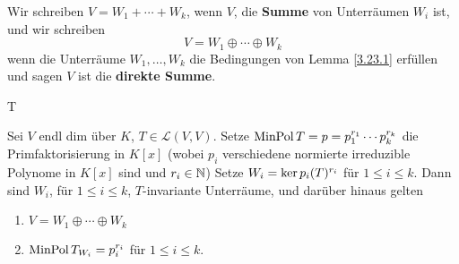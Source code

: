 \begin{subdefinition*}
	Wir schreiben $ V = W_1 + \dotsb + W_k $, wenn $ V $, die \textbf{Summe} von Unterräumen $ W_i $ ist, und wir schreiben
	\[
		V = W_1 \oplus \dotsb \oplus W_k
	\]
	wenn die Unterräume $ W_1, \dotsc, W_k $ die Bedingungen von Lemma \ref{3.23.1} erfüllen und sagen $ V $ ist die \textbf{direkte Summe}.
\end{subdefinition*}
T
\begin{subtheorem}
	Sei $ V $ endl dim über $ K $, $ T \in \mathcal{L} (V, V) $.
	Setze $ \operatorname{Min Pol} T = p = p_1^{r_1} \dotsb p_k^{r_k}  $ die Primfaktorisierung in $ K[x] $ 
	(wobei $ p_i $ verschiedene normierte irreduzible Polynome in $ K[x] $ sind und $ r_i \in \mathbb{N}  $)
	Setze $ W_i = \operatorname{ker} p_i (T) ^{r_i}  $ für $ 1 \leq i \leq k $.
	Dann sind $ W_i $, für $ 1 \leq i \leq k $, $ T $-invariante Unterräume, und darüber hinaus gelten
	\begin{enumerate}[label=(\roman*)]
		\item $ V = W_1 \oplus \dotsb \oplus W_k $ 
		\item $ \operatorname{Min Pol} T_{W_i} = p_i^{r_i}  $ für $ 1 \leq i \leq k $.
	\end{enumerate}
\end{subtheorem}

